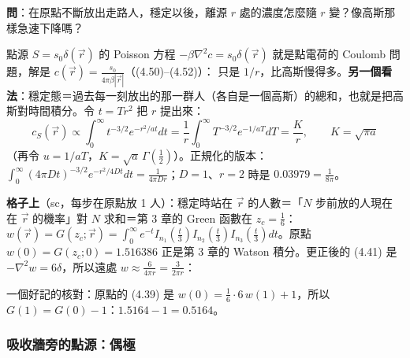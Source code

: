 \textbf{問}：在原點不斷放出走路人，穩定以後，離源 $r$ 處的濃度怎麼隨 $r$ 變？像高斯那樣急速下降嗎？

點源 $S=s_0\delta(\vec r)$ 的 Poisson 方程 $-\beta\nabla^2c=s_0\delta(\vec r)$ 就是點電荷的 Coulomb 問題，解是 $c(\vec r)=\frac{s_0}{4\pi\beta|\vec r|}$（(4.50)--(4.52)）：
只是 $1/r$，比高斯慢得多。\textbf{另一個看法}：穩定態＝過去每一刻放出的那一群人（各自是一個高斯）的總和，也就是把高斯對時間積分。令 $t=Tr^2$ 把 $r$ 提出來：
\[c_S(\vec r)\propto\int_0^\infty t^{-3/2}e^{-r^2/at}dt=\frac1r\int_0^\infty T^{-3/2}e^{-1/aT}dT=\frac Kr,\qquad K=\sqrt{\pi a}\tag{4.55, 4.56}\]
（再令 $u=1/aT$，$K=\sqrt a\,\Gamma(\frac12)$）。正規化的版本：$\int_0^\infty(4\pi Dt)^{-3/2}e^{-r^2/4Dt}dt=\frac1{4\pi Dr}$；$D=1$、$r=2$ 時是 $0.03979=\frac{1}{8\pi}$。

\textbf{格子上}（sc，每步在原點放 1 人）：穩定時站在 $\vec r$ 的人數＝「$N$ 步前放的人現在在 $\vec r$ 的機率」對 $N$ 求和＝第 3 章的 Green 函數在 $z_c=\frac16$：$w(\vec r)=G(z_c;\vec r)=\int_0^\infty e^{-t}I_{n_1}(\tfrac t3)I_{n_2}(\tfrac t3)I_{n_3}(\tfrac t3)dt$。原點 $w(0)=G(z_c;0)=1.516386$ 正是第 3 章的 Watson 積分。更正後的 (4.41) 是 $-\nabla^2w=6\delta$，所以遠處 $w\approx\frac{6}{4\pi r}=\frac{3}{2\pi r}$：
\begin{table}[H]
\centering
\FourTabGreen
\caption{sc 格子、每步在原點放 1 人的穩定濃度 $w$（沿 $x$ 軸）。$n\,G$ 趨近 $3/2\pi=0.4775$；照書上的 $3/a^2$ 會得 $3/4\pi=0.2387$，差 2 倍}\label{four-tab-green}
\end{table}
一個好記的核對：原點的 (4.39) 是 $w(0)=\frac16\cdot6\,w(1)+1$，所以 $G(1)=G(0)-1$：$1.5164-1=0.5164$。

\subsubsection{吸收牆旁的點源：偶極}
\ 

